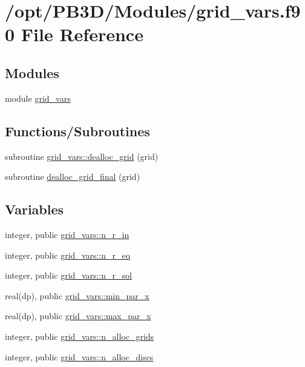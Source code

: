 \hypertarget{grid__vars_8f90}{}\section{/opt/\+P\+B3\+D/\+Modules/grid\+\_\+vars.f90 File Reference}
\label{grid__vars_8f90}
\subsection*{Modules}
\begin{DoxyCompactItemize}
\item 
module \hyperlink{namespacegrid__vars}{grid\+\_\+vars}
\end{DoxyCompactItemize}
\subsection*{Functions/\+Subroutines}
\begin{DoxyCompactItemize}
\item 
subroutine \hyperlink{namespacegrid__vars_abc8ea59261a1e773754afebdb13276f9}{grid\+\_\+vars\+::dealloc\+\_\+grid} (grid)
\item 
subroutine \hyperlink{grid__vars_8f90_ad8906f7cbf740b674a5036d6b952ae48}{dealloc\+\_\+grid\+\_\+final} (grid)
\end{DoxyCompactItemize}
\subsection*{Variables}
\begin{DoxyCompactItemize}
\item 
integer, public \hyperlink{namespacegrid__vars_ad1047cc6f07720d61c8e6fdc3c68a317}{grid\+\_\+vars\+::n\+\_\+r\+\_\+in}
\item 
integer, public \hyperlink{namespacegrid__vars_aa3785d71892d3d7db81aca0b6aa880b0}{grid\+\_\+vars\+::n\+\_\+r\+\_\+eq}
\item 
integer, public \hyperlink{namespacegrid__vars_ad998db12a656afb94d2d54a7d0eca642}{grid\+\_\+vars\+::n\+\_\+r\+\_\+sol}
\item 
real(dp), public \hyperlink{namespacegrid__vars_a689c08cf03bc54338878f85c6429b856}{grid\+\_\+vars\+::min\+\_\+par\+\_\+x}
\item 
real(dp), public \hyperlink{namespacegrid__vars_acaa1fd21d0c728ad8f24591c0d2a5801}{grid\+\_\+vars\+::max\+\_\+par\+\_\+x}
\item 
integer, public \hyperlink{namespacegrid__vars_ac4b43443d16af06fdc62d542b3eadee2}{grid\+\_\+vars\+::n\+\_\+alloc\+\_\+grids}
\item 
integer, public \hyperlink{namespacegrid__vars_a23b5e4789dc5d3d0d6dadeb47909ddbd}{grid\+\_\+vars\+::n\+\_\+alloc\+\_\+discs}
\end{DoxyCompactItemize}


